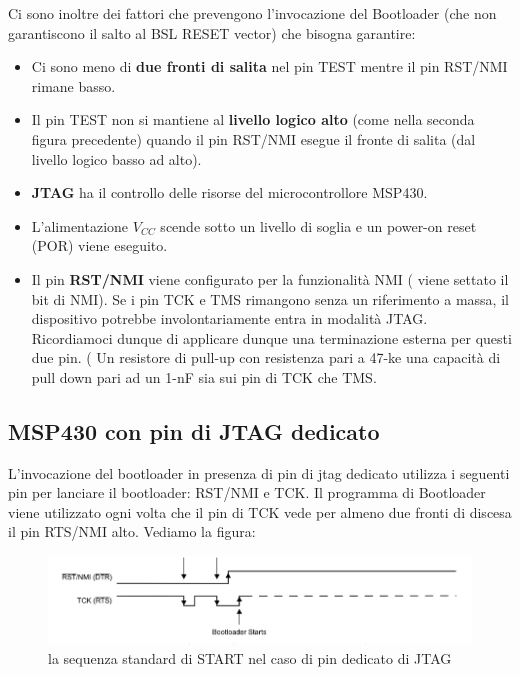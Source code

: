 \documentclass[LaM,binding=0.6cm]{../sapthesis}
\begin{document}
Ci sono inoltre dei fattori che prevengono l’invocazione del Bootloader (che non garantiscono il salto al BSL RESET vector) che bisogna garantire:
\begin{itemize}
\item Ci sono meno di \textbf{due fronti di salita} nel pin TEST mentre il pin RST/NMI rimane basso.
\item Il pin TEST non si mantiene al \textbf{livello logico alto} (come nella seconda figura precedente) quando il pin RST/NMI esegue il fronte di salita (dal livello logico basso ad alto).
\item \textbf{JTAG} ha il controllo delle risorse del microcontrollore MSP430.
\item L’alimentazione \textbf{$V_{CC}$} scende sotto un livello di soglia e un power-on reset (POR) viene eseguito.
\item Il pin \textbf{RST/NMI} viene configurato per la funzionalità NMI ( viene settato il bit di NMI).
 Se i pin TCK e TMS rimangono senza un riferimento a massa, il dispositivo potrebbe involontariamente entra in modalità JTAG. Ricordiamoci dunque di applicare dunque una terminazione esterna per questi due pin. ( Un resistore di pull-up con
resistenza pari a 47-k\ohm e una capacità di pull down pari ad un 1-nF sia sui pin di TCK che TMS.
\end{itemize}

\subsection{MSP430 con pin di JTAG dedicato}

L’invocazione del bootloader in presenza di pin di jtag dedicato utilizza i seguenti pin per lanciare il bootloader: RST/NMI e TCK.
Il programma di Bootloader viene utilizzato ogni volta che il pin di TCK vede per almeno due fronti di discesa il pin RTS/NMI alto.
Vediamo la figura:

\begin{figure}[htbp]
\centerline{\includegraphics[scale=0.47]{examples/JTAGPin.png}}
\caption{la sequenza standard di START nel caso di pin dedicato di JTAG}
\label{fig}
\end{figure}
\end{document}
